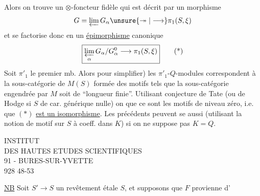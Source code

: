 Alors on trouve un $\otimes$-foncteur  fidèle
qui est décrit par un morphisme
\[
G=\varprojlim G_\alpha\unsure{\twoheadrightarrow|\longrightarrow}\pi_1(S,\xi)
\]
et se factorise donc en un \uline{épimorphisme} canonique
\[
\boxed{\varprojlim_{\alpha}G_\alpha/G_\alpha^0\longrightarrow\pi_1(S,\xi)}\tag*{(*)}
\]
Soit $\pi'_1$ le premier mb. Alors   pour simplifier) les $\pi'_1$-$Q$-modules correspondent à la sous-catégorie de $M(S)$ formée des motifs  tels que la sous-\inserted{$\otimes$-}catégorie engendrée par $M$ soit de ``longueur finie''. Utilisant conjecture de Tate (ou de Hodge si $S$ de car. générique nulle) on   que ce sont les motifs  de niveau  zéro,  i.e. que $(*)$ \uline{est un isomorphisme}. Les  précédents peuvent se  aussi (utilisant la notion de motif sur $S$ à coeff. dans $K$) si on ne suppose pas $K=Q$.

INSTITUT\\
DES HAUTES ETUDES SCIENTIFIQUES\\
91 - BURES-SUR-YVETTE\\
928 48-53

\uline{NB} Soit $S'\longrightarrow{}S$ un revêtement étale  $S$,  et supposons que $F$ provienne d'

